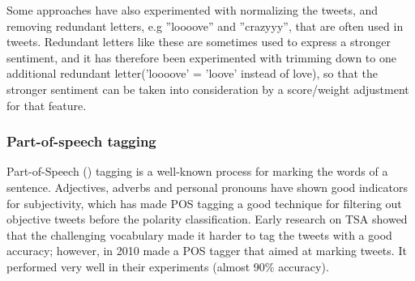 Some approaches have also experimented with normalizing the tweets, and removing redundant letters, e.g ''loooove'' and ''crazyyy'', that are often used in tweets. Redundant letters like these are sometimes used to express a stronger sentiment, and it has therefore been experimented with trimming down to one additional redundant letter('loooove' = 'loove’ instead of love), so that the stronger sentiment can be taken into consideration by a score/weight adjustment for that feature.

\subsubsection*{Part-of-speech tagging}
Part-of-Speech () tagging is a well-known process for marking the words of a sentence. Adjectives, adverbs and personal pronouns have shown good indicators for subjectivity, which has made POS tagging a good technique for filtering out objective tweets before the polarity classification. Early research on TSA showed that the challenging vocabulary made it harder to tag the tweets with a good accuracy; however, in 2010 \cite{article:gimpel} made a POS tagger that aimed at marking tweets. It performed very well in their experiments (almost 90\% accuracy).
